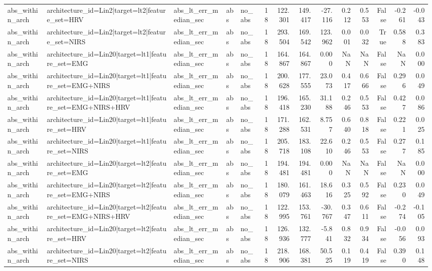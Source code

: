\begin{table}
\begin{tabular}{lllllrrrrrrrrr}
abs_within_arch & architecture_id=Lin2|target=lt2|feature_set=HRV & abs_lt_err_median_sec & abs & no_abs & 18 & 122.301 & 149.417 & -27.116 & 0.212 & 0.553 & False & -0.261 & -0.043 \\
abs_within_arch & architecture_id=Lin2|target=lt2|feature_set=NIRS & abs_lt_err_median_sec & abs & no_abs & 18 & 293.504 & 169.542 & 123.962 & 0.001 & 0.032 & True & 0.588 & 0.383 \\
abs_within_arch & architecture_id=Lin20|target=lt1|feature_set=EMG & abs_lt_err_median_sec & abs & no_abs & 18 & 164.867 & 164.867 & 0.000 & NaN & NaN & False & NaN & 0.000 \\
abs_within_arch & architecture_id=Lin20|target=lt1|feature_set=EMG+NIRS & abs_lt_err_median_sec & abs & no_abs & 18 & 200.628 & 177.555 & 23.073 & 0.417 & 0.666 & False & 0.296 & 0.049 \\
abs_within_arch & architecture_id=Lin20|target=lt1|feature_set=EMG+NIRS+HRV & abs_lt_err_median_sec & abs & no_abs & 18 & 196.418 & 165.230 & 31.188 & 0.246 & 0.553 & False & 0.427 & 0.086 \\
abs_within_arch & architecture_id=Lin20|target=lt1|feature_set=HRV & abs_lt_err_median_sec & abs & no_abs & 18 & 171.288 & 162.531 & 8.757 & 0.640 & 0.818 & False & 0.221 & 0.025 \\
abs_within_arch & architecture_id=Lin20|target=lt1|feature_set=NIRS & abs_lt_err_median_sec & abs & no_abs & 18 & 205.718 & 183.108 & 22.610 & 0.246 & 0.553 & False & 0.277 & 0.185 \\
abs_within_arch & architecture_id=Lin20|target=lt2|feature_set=EMG & abs_lt_err_median_sec & abs & no_abs & 18 & 194.481 & 194.481 & 0.000 & NaN & NaN & False & NaN & 0.000 \\
abs_within_arch & architecture_id=Lin20|target=lt2|feature_set=EMG+NIRS & abs_lt_err_median_sec & abs & no_abs & 18 & 180.079 & 161.463 & 18.616 & 0.325 & 0.592 & False & 0.230 & 0.049 \\
abs_within_arch & architecture_id=Lin20|target=lt2|feature_set=EMG+NIRS+HRV & abs_lt_err_median_sec & abs & no_abs & 18 & 122.995 & 153.761 & -30.767 & 0.347 & 0.611 & False & -0.274 & -0.105 \\
abs_within_arch & architecture_id=Lin20|target=lt2|feature_set=HRV & abs_lt_err_median_sec & abs & no_abs & 18 & 126.936 & 132.777 & -5.841 & 0.832 & 0.934 & False & -0.056 & 0.093 \\
abs_within_arch & architecture_id=Lin20|target=lt2|feature_set=NIRS & abs_lt_err_median_sec & abs & no_abs & 18 & 218.906 & 168.381 & 50.525 & 0.119 & 0.419 & False & 0.390 & 0.148 \\

\end{tabular}
\end{table}
